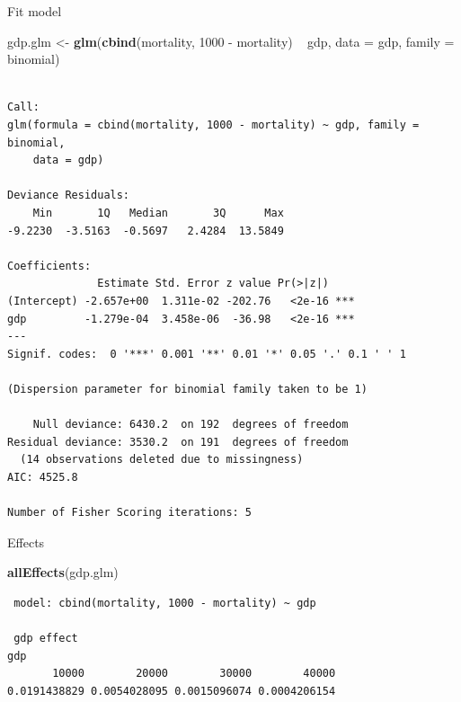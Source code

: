 \documentclass[10pt,ignorenonframetext,]{beamer}
\newenvironment{Shaded}{\begin{snugshade}}{\end{snugshade}}
\newcommand{\KeywordTok}[1]{\textcolor[rgb]{0.13,0.29,0.53}{\textbf{{#1}}}}
\newcommand{\DataTypeTok}[1]{\textcolor[rgb]{0.13,0.29,0.53}{{#1}}}
\newcommand{\DecValTok}[1]{\textcolor[rgb]{0.00,0.00,0.81}{{#1}}}
\newcommand{\StringTok}[1]{\textcolor[rgb]{0.31,0.60,0.02}{{#1}}}
\newcommand{\NormalTok}[1]{{#1}}
\begin{document}
\begin{frame}[fragile]{Fit model}

\begin{Shaded}
\begin{Highlighting}[]
\NormalTok{gdp.glm <-}\StringTok{ }\KeywordTok{glm}\NormalTok{(}\KeywordTok{cbind}\NormalTok{(mortality, }\DecValTok{1000} \NormalTok{-}\StringTok{ }\NormalTok{mortality) ~}\StringTok{ }\NormalTok{gdp, }
               \DataTypeTok{data =} \NormalTok{gdp, }\DataTypeTok{family =} \NormalTok{binomial)}
\end{Highlighting}
\end{Shaded}

\begin{verbatim}

Call:
glm(formula = cbind(mortality, 1000 - mortality) ~ gdp, family = binomial, 
    data = gdp)

Deviance Residuals: 
    Min       1Q   Median       3Q      Max  
-9.2230  -3.5163  -0.5697   2.4284  13.5849  

Coefficients:
              Estimate Std. Error z value Pr(>|z|)    
(Intercept) -2.657e+00  1.311e-02 -202.76   <2e-16 ***
gdp         -1.279e-04  3.458e-06  -36.98   <2e-16 ***
---
Signif. codes:  0 '***' 0.001 '**' 0.01 '*' 0.05 '.' 0.1 ' ' 1

(Dispersion parameter for binomial family taken to be 1)

    Null deviance: 6430.2  on 192  degrees of freedom
Residual deviance: 3530.2  on 191  degrees of freedom
  (14 observations deleted due to missingness)
AIC: 4525.8

Number of Fisher Scoring iterations: 5
\end{verbatim}

\end{frame}

\begin{frame}[fragile]{Effects}

\begin{Shaded}
\begin{Highlighting}[]
\KeywordTok{allEffects}\NormalTok{(gdp.glm)}
\end{Highlighting}
\end{Shaded}

\begin{verbatim}
 model: cbind(mortality, 1000 - mortality) ~ gdp

 gdp effect
gdp
       10000        20000        30000        40000 
0.0191438829 0.0054028095 0.0015096074 0.0004206154 
\end{verbatim}

\end{frame}
\end{document}
